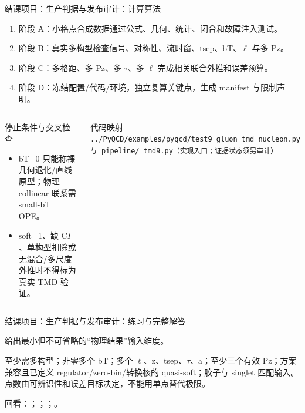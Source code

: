 \begin{frame}[t]{结课项目：生产判据与发布审计：计算算法}
\footnotesize
{}\begin{enumerate}
\item 阶段 A：小格点合成数据通过公式、几何、统计、闭合和故障注入测试。
\item 阶段 B：真实多构型检查信号、对称性、流时窗、tsep、bT、\ensuremath{\ell} 与多 Pz。
\item 阶段 C：多格距、多 Pz、多 \ensuremath{\tau}、多 \ensuremath{\ell} 完成相关联合外推和误差预算。
\item 阶段 D：冻结配置/\allowbreak{}代码/\allowbreak{}环境，独立复算关键点，生成 manifest 与限制声明。
\end{enumerate}\begin{columns}[T,onlytextwidth]
\begin{block}{停止条件与交叉检查}\scriptsize\begin{itemize}
\item[\CheckMark] bT=0 只能称裸几何退化/\allowbreak{}直线原型；物理 collinear 联系需 small-bT OPE。
\item[\CheckMark] soft=1、缺 C\ensuremath{\Gamma}、单构型扣除或无混合/\allowbreak{}多尺度外推时不得标为真实 TMD 验证。
\end{itemize}\end{block}
\begin{block}{代码映射}
\scriptsize \texttt{.\allowbreak{}.\allowbreak{}/\allowbreak{}PyQCD/\allowbreak{}examples/\allowbreak{}pyqcd/\allowbreak{}test9\_\allowbreak{}gluon\_\allowbreak{}tmd\_\allowbreak{}nucleon.\allowbreak{}py 与 pipeline/\allowbreak{}\_\allowbreak{}tmd9.\allowbreak{}py（实现入口；证据状态须另审计）}
\end{block}\end{columns}\end{frame}

\begin{frame}[t]{结课项目：生产判据与发布审计：练习与完整解答}
\footnotesize
\begin{block}{}给出最小但不可省略的“物理结果”输入维度。\end{block}
\begin{exampleblock}{}至少需多构型；非零多个 bT；多个 \ensuremath{\ell}、z、tsep、\ensuremath{\tau}、a；至少三个有效 Pz；方案兼容且已定义 regulator/\allowbreak{}zero-bin/\allowbreak{}转换核的 quasi-soft；胶子与 singlet 匹配输入。点数由可辨识性和误差目标决定，不能用单点替代极限。\end{exampleblock}
\vfill
\scriptsize 回看：；；；。
\end{frame}

